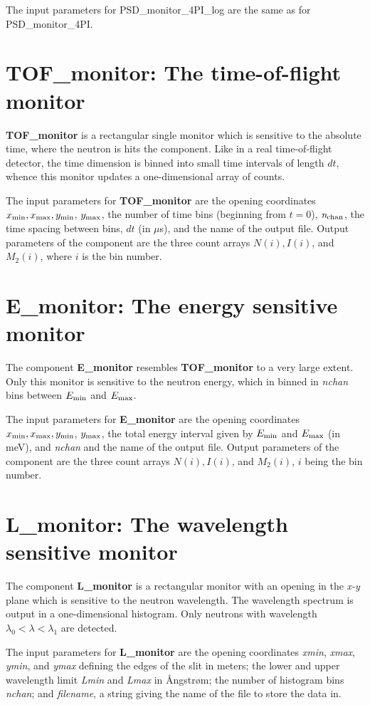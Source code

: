 The input parameters for PSD\_monitor\_4PI\_log are the same as for PSD\_monitor\_4PI.


\section{TOF\_monitor: The time-of-flight monitor}
{\bf TOF\_monitor} is a rectangular single monitor
which is sensitive to
the absolute time, where the neutron is hits the component.
Like in a real time-of-flight detector, the time dimension is
binned into small time intervals of length $dt$, whence this monitor
updates a one-dimensional array of counts.

The input parameters for {\bf TOF\_monitor} are the opening
coordinates $x_{\rm min}, x_{\rm max}, y_{\rm min}$, $y_{\rm max}$,
the number of time bins (beginning from $t=0$),
${\it n_{\rm chan}}$, the time spacing between bins, $dt$ (in $\mu$s),
and the name of the output file. Output parameters of the component
are the three count arrays $N(i), I(i)$, and $M_2(i)$, where $i$ is
the bin number.

\section{E\_monitor: The energy sensitive monitor}
\label{s:e_monitor}
The component {\bf E\_monitor} resembles {\bf TOF\_monitor}
to a very large extent. Only this monitor is sensitive to
the neutron energy, which in binned in \textit{nchan} bins between
$E_{\rm min}$ and $E_{\rm max}$.

The input parameters for {\bf E\_monitor} are the opening
coordinates $x_{\rm min}, x_{\rm max}, y_{\rm min}$, $y_{\rm max}$,
the total energy interval given by $E_{\rm min}$ and $E_{\rm max}$ (in meV), and
\textit{nchan} and the
name of the output file. Output parameters of the component
are the three count arrays
$N(i), I(i)$, and $M_2(i)$, $i$ being the bin number.


\section{L\_monitor: The wavelength sensitive monitor}
\label{s:L_monitor}
The component {\bf L\_monitor} is a rectangular monitor with an opening
in the \textit{x-y} plane which is sensitive to the neutron wavelength.
The wavelength spectrum is output in a one-dimensional histogram.
Only neutrons with
wavelength $\lambda_0 < \lambda < \lambda_1$ are detected.

The input parameters for {\bf L\_monitor} are the opening
coordinates \textit{xmin}, \textit{xmax}, \textit{ymin}, and
\textit{ymax} defining the edges of the slit in meters;
the lower and upper wavelength limit \textit{Lmin} and
\textit{Lmax} in {\AA}ngstr{\o}m; the number of histogram bins
\textit{nchan}; and \textit{filename}, a
string giving the name of the file to store the data in.


